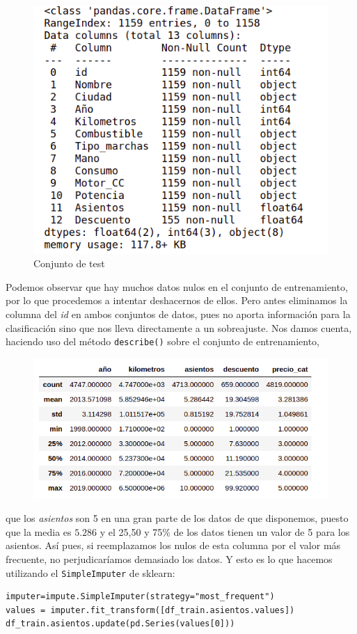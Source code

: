 \documentclass[a4paper,11pt]{article}
\begin{document}
\begin{figure}[H]
	\centering
	\includegraphics[width=0.5\linewidth]{img/test}
	\caption{Conjunto de test}
	\label{fig:test}
\end{figure}


Podemos observar que hay muchos datos nulos en el conjunto de entrenamiento, por lo que procedemos a intentar deshacernos de ellos. Pero antes eliminamos la columna del \textit{id} en ambos conjuntos de datos, pues no aporta información para la clasificación sino que nos lleva directamente a un sobreajuste.  Nos damos cuenta, haciendo uso del método \texttt{describe()} sobre el conjunto de entrenamiento,

\begin{figure}[H]
	\centering
	\includegraphics[width=0.8\linewidth]{img/train2}
	\caption{}
	\label{fig:train2}
\end{figure}

 que los \textit{asientos} son 5 en una gran parte de los datos de que disponemos, puesto que la media es $5.286$ y el 25,50 y 75\% de los datos tienen un valor de 5 para los asientos. Así pues, si reemplazamos los nulos de esta columna por el valor más frecuente, no perjudicaríamos demasiado los datos. Y esto es lo que hacemos utilizando el \texttt{SimpleImputer} de sklearn:
\begin{verbatim}
imputer=impute.SimpleImputer(strategy="most_frequent")
values = imputer.fit_transform([df_train.asientos.values])
df_train.asientos.update(pd.Series(values[0]))
\end{verbatim}
\end{document}

